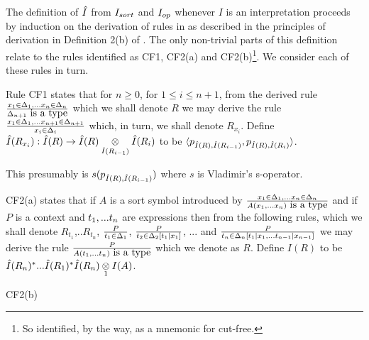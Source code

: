 
\begin{oldtt}
\note The definition of $\Ihat$ from $\Isort$ and $\Iop$ whenever $I$ is an interpretation proceeds by induction 
on the derivation of rules in  \gatUw 
as described in the principles of derivation in Definition 2(b) of \cite{Cartmell86}. 
The only non-trivial parts of this definition relate to the rules
identified as CF1, CF2(a) and CF2(b)\footnote{So identified, by the way, as a mnemonic for cut-free.}. We consider each of these rules in turn.

\begin{point}
Rule CF1 states that for $n \geq 0$, for $1 \leq i \leq n+1$, from the derived rule 
$\frac{\xDelta{n}}{\isT{\Delta_{n+1}}}$ which we shall denote $R$ 
we may derive the rule
$\frac{\xDelta{n+1}}{\ofT{x_i}{\Delta_i}}$ which, in turn, we shall denote $R_{x_i}$.
Define $\Ihat(R_{x_i}) :  \Ihat(R) \morph \crossx{\Ihat(R)}{\Ihat(R_i)}{\Ihat(R_{i-1})}$
to be $\tuple{p_{\Ihat(R),\Ihat(R_{i-1})},p_{\Ihat(R),\Ihat(R_{i})}}$. 

This presumably is $s(p_{\Ihat(R),\Ihat(R_{i-1})})$ where $s$ is Vladimir's s-operator.
\end{point}
\begin{point}
CF2(a) states that if $A$ is a sort symbol introduced by
$\frac{\xDelta{n}}{\isT{A(\xn)}}$ 
and if $P$ is a context and $\tn$ are expressions then from the following rules, which we shall denote $R_{t_1}$,..$R_{t_n}$,
$\frac{P}{\ofT{t_1}{\Delta_1}}$,
$\frac{P}{\ofT{t_2}{\Delta_2[t_1|x_1]}}$,
... and 
$\frac{P}{\ofT{t_n}{\Delta_n[t_1|x_1,...t_{n-1}|x_{n-1}]}}$
we may derive the rule
$\frac{P}{\isT{A(t_1,...t_n)}}$ which we denote as $R$. 
Define $I(R)$ to be $\Ihat(R_n)^*...\Ihat(R_1)^*\crossx{\Ihat(R_n)}{I(A)}{1}$.
\end{point}
\begin{point}
CF2(b) 
\end{point}
\end{oldtt}

